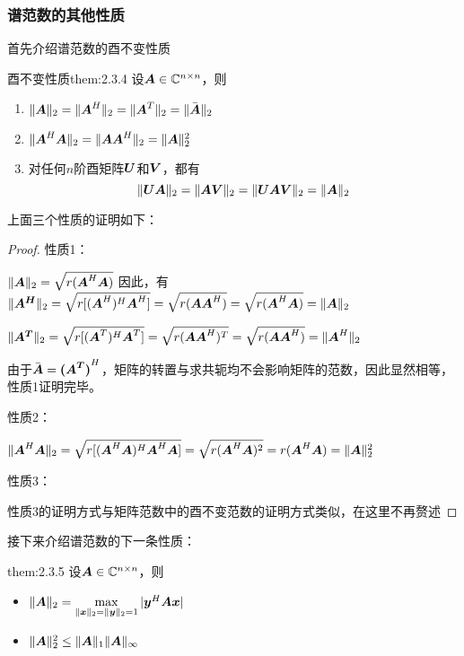 \documentclass[12pt, a4paper, oneside, UTF8]{ctexbook}
\begin{document}
\subsubsection{谱范数的其他性质}
首先介绍谱范数的酉不变性质
\begin{them}{酉不变性质}{them:2.3.4}
    设$\boldsymbol{A}\in\mathbb{C}^{n\times n}$，则
    \begin{enumerate}
        \item $\Vert\boldsymbol{A}\Vert_2=\Vert\boldsymbol{A}^H\Vert_2=\Vert\boldsymbol{A}^T\Vert_2=\Vert\bar{\boldsymbol{A}}\Vert_2$
        \item $\Vert\boldsymbol{A}^H\boldsymbol{A}\Vert_2=\Vert\boldsymbol{A}\boldsymbol{A}^H\Vert_2=\Vert\boldsymbol{A}\Vert_2^2$
        \item 对任何$n$阶酉矩阵$\boldsymbol{U}$和$\boldsymbol{V}$，都有\[\Vert\boldsymbol{UA}\Vert_2=\Vert\boldsymbol{AV}\Vert_2=\Vert\boldsymbol{UAV}\Vert_2=\Vert\boldsymbol{A}\Vert_2\]
    \end{enumerate}
\end{them}

上面三个性质的证明如下：

\begin{proof}

    性质1：

    $\Vert\boldsymbol{A}\Vert_2=\sqrt{r(\boldsymbol{A}^H\boldsymbol{A})}$
    因此，有$\Vert\boldsymbol{A^H}\Vert_2=\sqrt{r[(\boldsymbol{A}^H)^H\boldsymbol{A}^H]}=\sqrt{r(\boldsymbol{A}\boldsymbol{A}^H)}=\sqrt{r(\boldsymbol{A}^H\boldsymbol{A})}=\Vert\boldsymbol{A}\Vert_2$

    $\Vert\boldsymbol{A^T}\Vert_2=\sqrt{r[(\boldsymbol{A}^T)^H\boldsymbol{A}^T]}=\sqrt{r(\boldsymbol{A}\boldsymbol{A}^H)^T}=\sqrt{r(\boldsymbol{A}\boldsymbol{A}^H)}=\Vert\boldsymbol{A}^H\Vert_2$

    由于$\bar{\boldsymbol{A}}=\boldsymbol{(\boldsymbol{A}^T)}^H$，矩阵的转置与求共轭均不会影响矩阵的范数，因此显然相等，性质1证明完毕。

    性质2：

    $\Vert\boldsymbol{A}^H\boldsymbol{A}\Vert_2=\sqrt{r[(\boldsymbol{A}^H\boldsymbol{A})^H\boldsymbol{A}^H\boldsymbol{A}]}=\sqrt{r(\boldsymbol{A}^H\boldsymbol{A})^2}=r(\boldsymbol{A}^H\boldsymbol{A})=\Vert\boldsymbol{A}\Vert_2^2$

    性质3：

    性质3的证明方式与矩阵范数中的酉不变范数的证明方式类似，在这里不再赘述

\end{proof}

接下来介绍谱范数的下一条性质：
\begin{them}{}{them:2.3.5}
    设$\boldsymbol{A}\in\mathbb{C}^{n\times n}$，则
    \begin{itemize}
        \item $\Vert\boldsymbol{A}\Vert_2=\max\limits_{\Vert\boldsymbol{x}\Vert_2=\Vert\boldsymbol{y}\Vert_2=1}|\boldsymbol{y}^H\boldsymbol{A}\boldsymbol{x}|$
        \item $\Vert\boldsymbol{A}\Vert_2^2\leq \Vert\boldsymbol{A}\Vert_1\Vert\boldsymbol{A}\Vert_{\infty}$
    \end{itemize}
\end{them}
\end{document}

